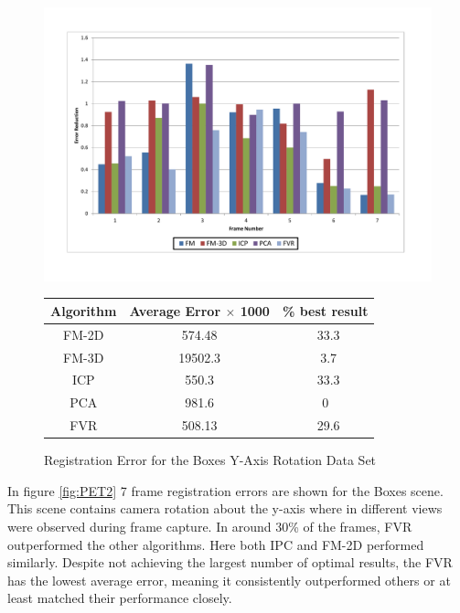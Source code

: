 \begin{figure}
\centering
\includegraphics[width=6in]{images/results/Boxes_Texture_Rotate}
\caption{Registration Error for the Boxes Y-Axis Rotation Data Set}
\label{fig:PET2}

\begin{tabular}{ccc}
\hline
\textbf{Algorithm} & \textbf{Average Error $\times$ 1000} & \textbf{\% best result}\\ \hline
FM-2D	& 574.48 & ~33.3\\
FM-3D	& 19502.3 & ~3.7\\
ICP		& 550.3 & ~33.3\\
PCA		& 981.6 & 0\\
FVR		& 508.13 & ~29.6\\
\end{tabular}
\label{tab:PET2ST}
\end{figure} 





In figure \ref{fig:PET2} 7 frame registration errors are shown for the Boxes scene. This scene contains camera rotation about the y-axis where in different views were observed during frame capture. In around 30\% of the frames, FVR outperformed the other algorithms. Here both IPC and FM-2D performed similarly. Despite not achieving the largest number of optimal results, the FVR has the lowest average error, meaning it consistently outperformed others or at least matched their performance closely.  \\



